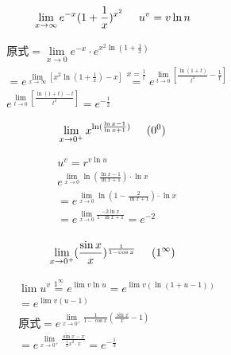 \documentclass[cn,cyan,fleqn]{elegantbook}
\begin{document}
\begin{problem}
\begin{equation*}
\lim\limits_{x\to\infty}e^{-x}(1+\frac{1}{x})^{x^2}\hspace{0.5cm}u^v=v\ln n \\
\end{equation*}
\end{problem}
\begin{solution}
\begin{equation*}
\begin{aligned}
       & \mbox{原式}=\lim\limits_{x\to 0}e^{-x}\cdot e^{x^2\ln(1+\frac{1}{x})}\\
       & =e^{\lim\limits_{x\to \infty}[x^2\ln(1+\frac{1}{x})-x]}\overset{x=\frac{1}{t}}{=}e^{\lim\limits_{t\to 0}[\frac{\ln(1+t)}{t^2}-\frac{1}{t}]}\\
       & e^{\lim\limits_{t\to 0}[\frac{\ln(1+t)-t}{t^2}]}=e^{-\frac{1}{2}}
\end{aligned}
\end{equation*}
\end{solution}
\begin{problem}
\begin{equation*}
\lim\limits_{x\to 0^+}x^{\ln(\frac{\ln x-1}{\ln x+1})}\hspace{0.5cm}(0^0)
\end{equation*}
\end{problem}
\begin{solution}
\begin{equation*}
\begin{aligned}
&u^v=r^{v\ln u}\\
&e^{\lim\limits_{x\to 0}\ln(\frac{\ln x-1}{\ln x+1})\cdot\ln x}\\
&=e^{\lim\limits_{x\to 0}\ln(1-\frac{2}{\ln x+1})\cdot\ln x}\\
&=e^{\lim\limits_{x\to 0}\frac{-2\ln x}{1\cdot\ln x+1}}=e^{-2}\\
\end{aligned}
\end{equation*}
\end{solution}
\begin{problem}
\begin{equation*}
\lim\limits_{x\to 0^+}(\frac{\sin x}{x})^{\frac{1}{1-\cos x}}\hspace{0.5cm}(1^\infty)
\end{equation*}
\end{problem}
\begin{solution}
\begin{equation*}
\begin{aligned}
&\lim u^v\overset{1^\infty}{=}e^{\lim v\ln u}=e^{\lim v(\ln(1+u-1))}\\
&=e^{\lim v(u-1)}\\
&\mbox{原式}=e^{\lim\limits_{x\to 0^+}\frac{1}{1-\cos x}(\frac{\sin x}{x}-1)}\\
&=e^{\lim\limits_{x\to 0^+}\frac{\sin x-x}{\frac{1}{2}x^2\cdot x}}=e^{-\frac{1}{3}}
\end{aligned}
\end{equation*}
\end{solution}
\end{document}
